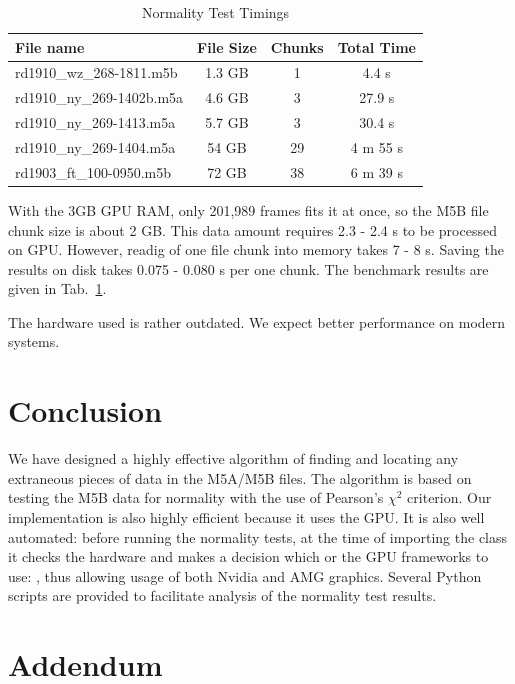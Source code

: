 \documentclass[letterpaper,twoside,12pt]{article}
\begin{document}
\begin{table}[ht!]
  \begin{center}
    \caption{Normality Test Timings}
    \label{timings}
    \begin{tabular}{l|c|c|c}
      \textbf{File name} & \textbf{File Size} & \textbf{Chunks} & \textbf{Total Time} \\
      \hline
      rd1910\_wz\_268-1811.m5b & 1.3 GB & 1 &  4.4 s \\
      rd1910\_ny\_269-1402b.m5a & 4.6 GB & 3 & 27.9 s \\
      rd1910\_ny\_269-1413.m5a & 5.7 GB & 3 & 30.4 s \\
      rd1910\_ny\_269-1404.m5a & 54 GB & 29 & 4 m 55 s \\
      rd1903\_ft\_100-0950.m5b & 72 GB & 38 & 6 m 39 s\\
    \end{tabular}
  \end{center}
\end{table}

With the 3GB GPU RAM, only 201,989 frames fits it at once, so the M5B file chunk size is about 2 GB. This data amount requires 2.3 - 2.4 s to be processed on GPU. However, readig of one file chunk into memory takes 7 - 8 s. Saving the results on disk takes 0.075 - 0.080 s per one chunk. The benchmark results are given in Tab.~\ref{timings}.

The hardware used is rather outdated. We expect better performance on modern systems. 
 

\section{Conclusion}

We have designed a highly effective algorithm of finding and locating any extraneous pieces of data in the M5A/M5B files. The algorithm is based on testing the M5B data for normality with the use of Pearson's $\chi^2$ criterion. Our implementation is also highly efficient because it uses the GPU. It is also well automated: before running the normality tests, at the time of importing the class \verb@Normtest@ it checks the hardware and makes a decision which or the GPU frameworks to use: \verb@CUDA@ \verb@OpenCL@, thus allowing usage of both Nvidia and AMG graphics. Several Python scripts are provided to facilitate analysis of the normality test results.


\newpage

\section*{Addendum}
\end{document}
